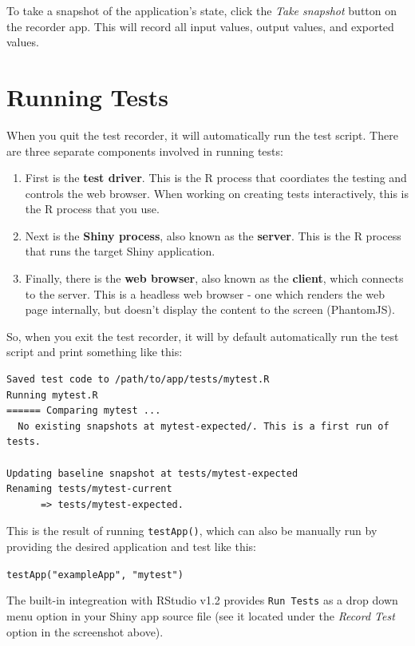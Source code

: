 \documentclass[]{book}
\providecommand{\tightlist}{%
  \setlength{\itemsep}{0pt}\setlength{\parskip}{0pt}}
\theoremstyle{definition}
\theoremstyle{definition}
\theoremstyle{definition}
\theoremstyle{remark}
\begin{document}
To take a snapshot of the application's state, click the \emph{Take
snapshot} button on the recorder app. This will record all input values,
output values, and exported values.

\hypertarget{running-tests}{%
\section{Running Tests}\label{running-tests}}

When you quit the test recorder, it will automatically run the test
script. There are three separate components involved in running tests:

\begin{enumerate}
\def\labelenumi{\arabic{enumi}.}
\tightlist
\item
  First is the \textbf{test driver}. This is the R process that
  coordiates the testing and controls the web browser. When working on
  creating tests interactively, this is the R process that you use.
\item
  Next is the \textbf{Shiny process}, also known as the \textbf{server}.
  This is the R process that runs the target Shiny application.
\item
  Finally, there is the \textbf{web browser}, also known as the
  \textbf{client}, which connects to the server. This is a headless web
  browser - one which renders the web page internally, but doesn't
  display the content to the screen (PhantomJS).
\end{enumerate}

So, when you exit the test recorder, it will by default automatically
run the test script and print something like this:

\begin{verbatim}
Saved test code to /path/to/app/tests/mytest.R
Running mytest.R 
====== Comparing mytest ...
  No existing snapshots at mytest-expected/. This is a first run of tests.

Updating baseline snapshot at tests/mytest-expected
Renaming tests/mytest-current
      => tests/mytest-expected.
\end{verbatim}

This is the result of running \texttt{testApp()}, which can also be
manually run by providing the desired application and test like this:

\texttt{testApp("exampleApp",\ "mytest")}

The built-in integreation with RStudio v1.2 provides \texttt{Run\ Tests}
as a drop down menu option in your Shiny app source file (see it located
under the \emph{Record Test} option in the screenshot above).
\end{document}

